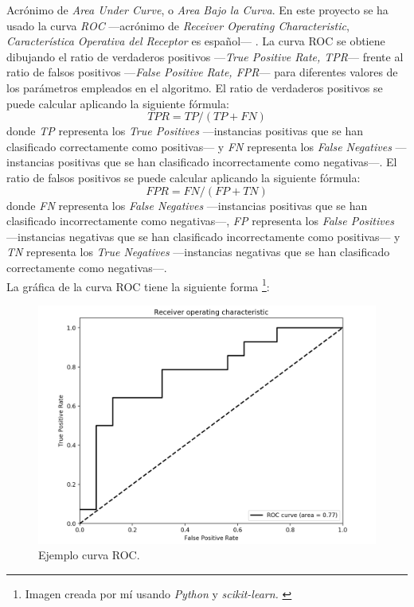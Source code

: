 Acrónimo de \textit{Area Under Curve}, o \textit{Area Bajo la Curva}. En este proyecto se ha usado la curva \textit{ROC} —acrónimo de \textit{Receiver Operating Characteristic}, \textit{Característica Operativa del Receptor} es español— \cite{roc}. La curva ROC se obtiene dibujando el ratio de verdaderos positivos —\textit{True Positive Rate, TPR}— frente al ratio de falsos positivos —\textit{False Positive Rate, FPR}— para diferentes valores de los parámetros empleados en el algoritmo. El ratio de verdaderos positivos se puede calcular aplicando la siguiente fórmula:
\begin{equation}
	\label{eq:tpr}
	TPR = TP / (TP + FN)
\end{equation}
donde \textit{TP} representa los \textit{True Positives} —instancias positivas que se han clasificado correctamente como positivas— y \textit{FN} representa los \textit{False Negatives} —instancias positivas que se han clasificado incorrectamente como negativas—. El ratio de falsos positivos se puede calcular aplicando la siguiente fórmula:
\begin{equation}
	FPR = FN / (FP + TN)
\end{equation}
donde \textit{FN} representa los \textit{False Negatives} —instancias positivas que se han clasificado incorrectamente como negativas—, \textit{FP} representa los \textit{False Positives} —instancias negativas que se han clasificado incorrectamente como positivas— y \textit{TN} representa los \textit{True Negatives} —instancias negativas que se han clasificado correctamente como negativas—. \\

La gráfica de la curva ROC tiene la siguiente forma \footnote{Imagen creada por mí usando \textit{Python} \cite{pythonweb} y \textit{scikit-learn.} \cite{scikit-learn}}:

\begin{figure}[H]
	\includegraphics[width=\linewidth]{./imagenes/7_roc.png}
	\caption{Ejemplo curva ROC.}
	\label{img:roc}
\end{figure}


